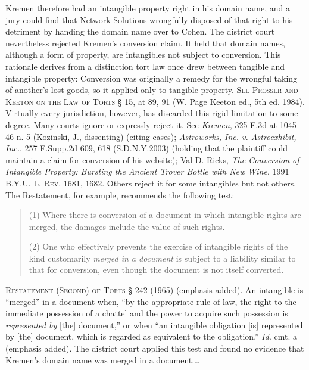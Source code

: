 Kremen therefore had an intangible property right in his domain name, and a jury
could find that Network Solutions wrongfully disposed of that right to his
detriment by handing the domain name over to Cohen. The district court
nevertheless rejected Kremen's conversion claim. It held that domain names,
although a form of property, are intangibles not subject to conversion. This
rationale derives from a distinction tort law once drew between tangible and
intangible property: Conversion was originally a remedy for the wrongful taking
of another's lost goods, so it applied only to tangible property. \textsc{See
Prosser and Keeton on the Law of Torts} {\S} 15, at 89, 91 (W. Page Keeton ed.,
5th ed. 1984). Virtually every jurisdiction, however, has discarded this rigid
limitation to some degree. Many courts ignore or expressly reject it. See
\textit{Kremen}, 325 F.3d at 1045-46 n. 5 (Kozinski, J., dissenting) (citing
cases); \textit{Astroworks, Inc. v. Astroexhibit, Inc.}, 257 F.Supp.2d 609, 618
(S.D.N.Y.2003) (holding that the plaintiff could maintain a claim for
conversion of his website); Val D. Ricks, \textit{The Conversion of Intangible
Property: Bursting the Ancient Trover Bottle with New Wine}, 1991
\textsc{B.Y.U. L. Rev.} 1681, 1682. Others reject it for some intangibles but
not others. The Restatement, for example, recommends the following test:
\begin{quotation}
(1) Where there is conversion of a document in which intangible rights are
merged, the damages include the value of such rights.

(2) One who effectively prevents the exercise of intangible rights of the kind
customarily \textit{merged in a document} is subject to a liability similar to
that for conversion, even though the document is not itself converted.
\end{quotation}

\textsc{Restatement (Second) of Torts} {\S} 242 (1965) (emphasis added). An
intangible is ``merged'' in a document when, ``by the appropriate rule of law,
the right to the immediate possession of a chattel and the power to acquire
such possession is \textit{represented by} [the] document,'' or when ``an
intangible obligation [is] represented by [the] document, which is regarded as
equivalent to the obligation.'' \textit{Id}. cmt. a (emphasis
added). The district court applied this test and
found no evidence that Kremen's domain name was merged in a document.\ldots

